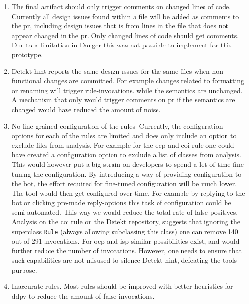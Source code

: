 \documentclass[pdftex,10pt,b5paper,twoside]{report}
\begin{document}
\begin{enumerate}

    \item The final artifact should only trigger comments on changed lines of code. Currently all design issues found within a file will be added as comments to the \gls{pr}, including design issues that is from lines in the file that does not appear changed in the \gls{pr}. Only changed lines of code should get comments. Due to a limitation in Danger this was not possible to implement for this prototype.
    
    \item Detekt-hint reports the same design issues for the same files when non-functional changes are committed. For example changes related to formatting or renaming will trigger rule-invocations, while the semantics are unchanged. A mechanism that only would trigger comments on \gls{pr} if the semantics are changed would have reduced the amount of noise.
    
    \item No fine grained configuration of the rules. Currently, the configuration options for each of the rules are limited and does only include an option to exclude files from analysis. For example for the \gls{ocp} and \gls{coi} rule one could have created a configuration option to exclude a list of classes from analysis. This would however put a big strain on developers to spend a lot of time fine tuning the configuration. By introducing a way of providing configuration to the bot, the effort required for fine-tuned configuration will be much lower. The tool would then get configured over time. For example by replying to the bot or clicking pre-made reply-options this task of configuration could be semi-automated. This way we would reduce the total rate of false-positives. Analysis on the \gls{coi} rule on the Detekt repository, suggests that ignoring the superclass \texttt{Rule} (always allowing subclassing this class) one can remove 140 out of 291 invocations. For \gls{ocp} and \gls{isp} similar possibilities exist, and would further reduce the number of invocations. However, one needs to ensure that such capabilities are not misused to silence Detekt-hint, defeating the tools purpose.
    
    \item Inaccurate rules. Most rules should be improved with better heuristics for \gls{ddpv} to reduce the amount of false-invocations.
   
\end{enumerate}
\end{document}
